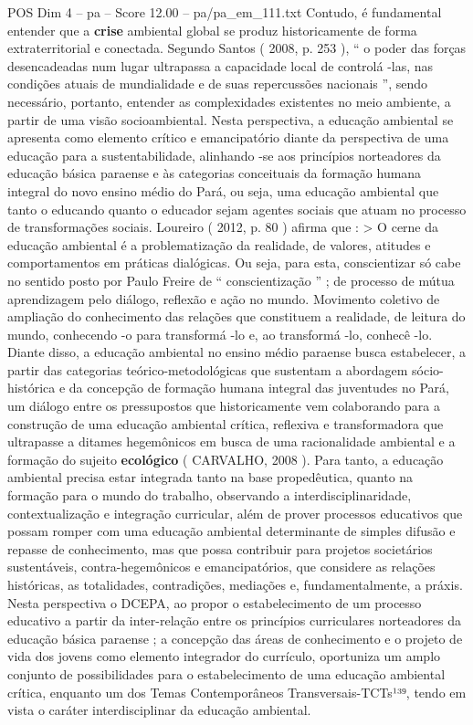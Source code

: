 \begin{textsample}{POS Dim 4 – pa – Score 12.00 – pa/pa\_em\_111.txt}
Contudo, é fundamental entender que a \textbf{crise} ambiental global se produz historicamente de forma extraterritorial e conectada.
Segundo Santos ( 2008, p. 253 ), “ o poder das forças desencadeadas num lugar ultrapassa a capacidade local de controlá -las, nas condições atuais de mundialidade e de suas repercussões nacionais ”, sendo necessário, portanto, entender as complexidades existentes no meio ambiente, a partir de uma visão socioambiental.
Nesta perspectiva, a educação ambiental se apresenta como elemento crítico e emancipatório diante da perspectiva de uma educação para a sustentabilidade, alinhando -se aos princípios norteadores da educação básica paraense e às categorias conceituais da formação humana integral do novo ensino médio do Pará, ou seja, uma educação ambiental que tanto o educando quanto o educador sejam agentes sociais que atuam no processo de transformações sociais.
Loureiro ( 2012, p. 80 ) afirma que : > O cerne da educação ambiental é a problematização da realidade, de valores, atitudes e comportamentos em práticas dialógicas.
Ou seja, para esta, conscientizar só cabe no sentido posto por Paulo Freire de “ conscientização ” ; de processo de mútua aprendizagem pelo diálogo, reflexão e ação no mundo.
Movimento coletivo de ampliação do conhecimento das relações que constituem a realidade, de leitura do mundo, conhecendo -o para transformá -lo e, ao transformá -lo, conhecê -lo.
Diante disso, a educação ambiental no ensino médio paraense busca estabelecer, a partir das categorias teórico-metodológicas que sustentam a abordagem sócio-histórica e da concepção de formação humana integral das juventudes no Pará, um diálogo entre os pressupostos que historicamente vem colaborando para a construção de uma educação ambiental crítica, reflexiva e transformadora que ultrapasse a ditames hegemônicos em busca de uma racionalidade ambiental e a formação do sujeito \textbf{ecológico} ( CARVALHO, 2008 ).
Para tanto, a educação ambiental precisa estar integrada tanto na base propedêutica, quanto na formação para o mundo do trabalho, observando a interdisciplinaridade, contextualização e integração curricular, além de prover processos educativos que possam romper com uma educação ambiental determinante de simples difusão e repasse de conhecimento, mas que possa contribuir para projetos societários sustentáveis, contra-hegemônicos e emancipatórios, que considere as relações históricas, as totalidades, contradições, mediações e, fundamentalmente, a práxis.
Nesta perspectiva o DCEPA, ao propor o estabelecimento de um processo educativo a partir da inter-relação entre os princípios curriculares norteadores da educação básica paraense ; a concepção das áreas de conhecimento e o projeto de vida dos jovens como elemento integrador do currículo, oportuniza um amplo conjunto de possibilidades para o estabelecimento de uma educação ambiental crítica, enquanto um dos Temas Contemporâneos Transversais-TCTs¹³⁹, tendo em vista o caráter interdisciplinar da educação ambiental.

\end{textsample}
